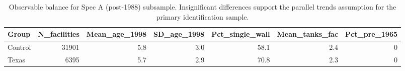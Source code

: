 \begin{table}[!h]
\centering
\caption{\label{tab:tab:specA-balance-raw}Observable balance for Spec A (post-1988) subsample. Insignificant differences support the parallel trends assumption for the primary identification sample.}
\centering
\fontsize{10}{12}\selectfont
\begin{tabular}[t]{lrrrrrr}
\toprule
Group & N_facilities & Mean_age_1998 & SD_age_1998 & Pct_single_wall & Mean_tanks_fac & Pct_pre_1965\\
\midrule
Control & 31901 & 5.8 & 3.0 & 58.1 & 2.4 & 0\\
Texas & 6395 & 5.7 & 2.9 & 70.8 & 2.3 & 0\\
\bottomrule
\end{tabular}
\end{table}
